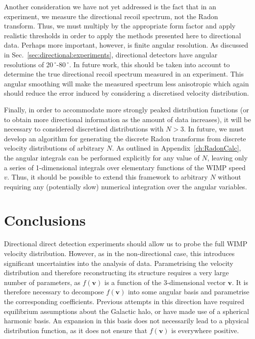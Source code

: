 Another consideration we have not yet addressed is the fact that in an experiment, we measure the directional recoil spectrum, not the Radon transform. Thus, we must multiply by the appropriate form factor and apply realistic thresholds in order to apply the methods presented here to directional data. Perhaps more important, however, is finite angular resolution. As discussed in Sec.~\ref{sec:directional:experiments}, directional detectors have angular resolutions of 20$\,^{\circ}$-80$\,^{\circ}$. In future work, this should be taken into account to determine the true directional recoil spectrum measured in an experiment. This angular smoothing will make the measured spectrum less anisotropic which again should reduce the error induced by considering a discretised velocity distribution.

Finally, in order to accommodate more strongly peaked distribution functions (or to obtain more directional information as the amount of data increases), it will be necessary to considered discretised distributions with $N > 3$. In future, we must develop an algorithm for generating the discrete Radon transforms from discrete velocity distributions of arbitrary $N$. As outlined in Appendix~\ref{ch:RadonCalc}, the angular integrals can be performed explicitly for any value of $N$, leaving only a series of 1-dimensional integrals over elementary functions of the WIMP speed $v$. Thus, it should be possible to extend this framework to arbitrary $N$ without requiring any (potentially slow) numerical integration over the angular variables.

\section{Conclusions}

Directional direct detection experiments should allow us to probe the full WIMP velocity distribution. However, as in the non-directional case, this introduces significant uncertainties into the analysis of data. Parametrising the velocity distribution and therefore reconstructing its structure requires a very large number of parameters, as $f(\mathbf{v})$ is a function of the 3-dimensional vector $\mathbf{v}$. It is therefore necessary to decompose $f(\mathbf{v})$ into some angular basis and parametrise the corresponding coefficients. Previous attempts in this direction have required equilibrium assumptions about the Galactic halo, or have made use of a spherical harmonic basis. An expansion in this basis does not necessarily lead to a physical distribution function, as it does not ensure that $f(\textbf{v})$ is everywhere positive.

